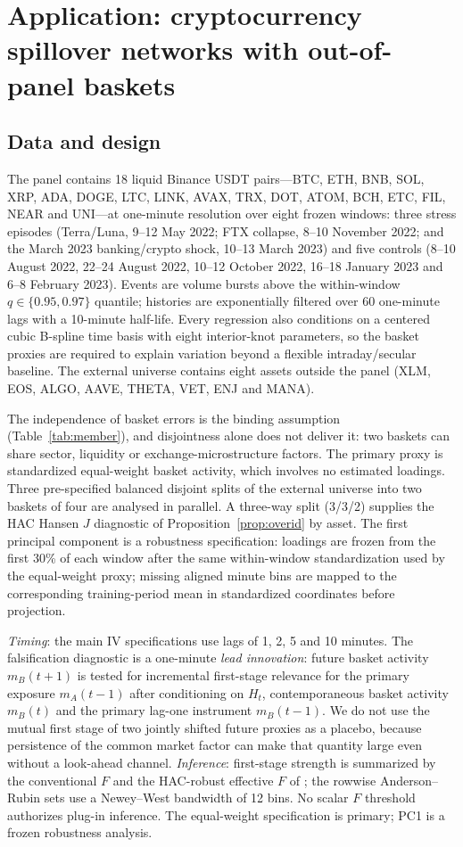 \documentclass[12pt]{article}
\theoremstyle{plain}\newtheorem{theorem}{Theorem}[section]\newtheorem{proposition}[theorem]{Proposition}\newtheorem{lemma}[theorem]{Lemma}\newtheorem{corollary}[theorem]{Corollary}
\theoremstyle{definition}\newtheorem{definition}[theorem]{Definition}\newtheorem{assumption}[theorem]{Assumption}\newtheorem{remark}[theorem]{Remark}
\begin{document}
\section{Application: cryptocurrency spillover networks with out-of-panel baskets}\label{sec:app}
\subsection{Data and design}
The panel contains 18 liquid Binance USDT pairs---BTC, ETH, BNB, SOL, XRP, ADA, DOGE, LTC, LINK, AVAX, TRX, DOT, ATOM, BCH, ETC, FIL, NEAR and UNI---at one-minute resolution over eight frozen windows: three stress episodes (Terra/Luna, 9--12 May 2022; FTX collapse, 8--10 November 2022; and the March 2023 banking/crypto shock, 10--13 March 2023) and five controls (8--10 August 2022, 22--24 August 2022, 10--12 October 2022, 16--18 January 2023 and 6--8 February 2023). Events are volume bursts above the within-window $q\in\{0.95,0.97\}$ quantile; histories are exponentially filtered over 60 one-minute lags with a 10-minute half-life. Every regression also conditions on a centered cubic B-spline time basis with eight interior-knot parameters, so the basket proxies are required to explain variation beyond a flexible intraday/secular baseline. The external universe contains eight assets outside the panel (XLM, EOS, ALGO, AAVE, THETA, VET, ENJ and MANA).

The independence of basket errors is the binding assumption (Table~\ref{tab:member}), and disjointness alone does not deliver it: two baskets can share sector, liquidity or exchange-microstructure factors. The primary proxy is standardized equal-weight basket activity, which involves no estimated loadings. Three pre-specified balanced disjoint splits of the external universe into two baskets of four are analysed in parallel. A three-way split (3/3/2) supplies the HAC Hansen $J$ diagnostic of Proposition~\ref{prop:overid} by asset. The first principal component is a robustness specification: loadings are frozen from the first 30\% of each window after the same within-window standardization used by the equal-weight proxy; missing aligned minute bins are mapped to the corresponding training-period mean in standardized coordinates before projection.

\emph{Timing}: the main IV specifications use lags of 1, 2, 5 and 10 minutes. The falsification diagnostic is a one-minute \emph{lead innovation}: future basket activity $m_B(t+1)$ is tested for incremental first-stage relevance for the primary exposure $m_A(t-1)$ after conditioning on $H_t$, contemporaneous basket activity $m_B(t)$ and the primary lag-one instrument $m_B(t-1)$. We do not use the mutual first stage of two jointly shifted future proxies as a placebo, because persistence of the common market factor can make that quantity large even without a look-ahead channel. \emph{Inference}: first-stage strength is summarized by the conventional $F$ and the HAC-robust effective $F$ of \citet{montielolea2013}; the rowwise Anderson--Rubin sets use a Newey--West bandwidth of 12 bins. No scalar $F$ threshold authorizes plug-in inference. The equal-weight specification is primary; PC1 is a frozen robustness analysis.
\end{document}
